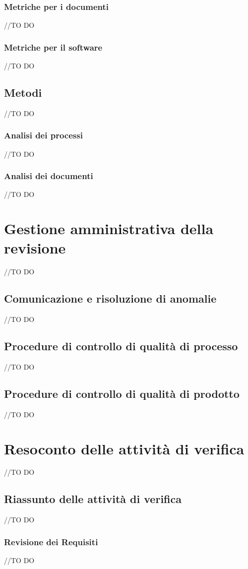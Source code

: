 \documentclass[12pt,a4paper]{article}
\begin{document}
\subsubsection{Metriche per i documenti}
//TO DO \AVI
\subsubsection{ Metriche per il software}
//TO DO \AVI
\subsection{Metodi}
//TO DO \AVI
\subsubsection{Analisi dei processi}
//TO DO \AVI
\subsubsection{Analisi dei documenti}
//TO DO \AVI
\newpage
\section{Gestione amministrativa della revisione}
//TO DO \AVI
\subsection{Comunicazione e risoluzione di anomalie}
//TO DO \AVI 
\subsection{Procedure di controllo di qualità di processo}
//TO DO \IB
\subsection{Procedure di controllo di qualità di prodotto}
//TO DO \IB
\newpage
\section{ Resoconto delle attività di verifica}
//TO DO \IB
\subsection{Riassunto delle attività di verifica}
//TO DO \IB
\subsubsection{Revisione dei Requisiti}
//TO DO \IB
\end{document}
